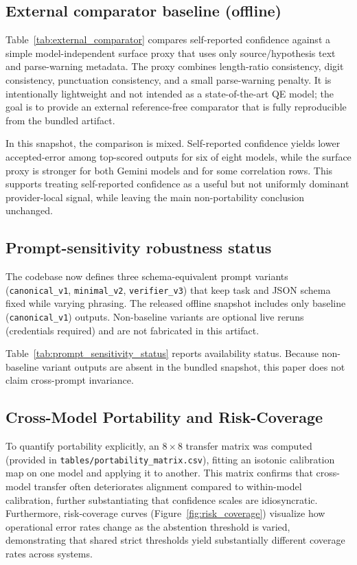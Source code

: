 \documentclass[10pt,conference]{IEEEtran}
\begin{document}


\subsection{External comparator baseline (offline)}
Table~\ref{tab:external_comparator} compares self-reported confidence against a simple model-independent surface proxy that uses only source/hypothesis text and parse-warning metadata. The proxy combines length-ratio consistency, digit consistency, punctuation consistency, and a small parse-warning penalty. It is intentionally lightweight and not intended as a state-of-the-art QE model; the goal is to provide an external reference-free comparator that is fully reproducible from the bundled artifact.

In this snapshot, the comparison is mixed. Self-reported confidence yields lower accepted-error among top-scored outputs for six of eight models, while the surface proxy is stronger for both Gemini models and for some correlation rows. This supports treating self-reported confidence as a useful but not uniformly dominant provider-local signal, while leaving the main non-portability conclusion unchanged.



\subsection{Prompt-sensitivity robustness status}
The codebase now defines three schema-equivalent prompt variants (\texttt{canonical\_v1}, \texttt{minimal\_v2}, \texttt{verifier\_v3}) that keep task and JSON schema fixed while varying phrasing. The released offline snapshot includes only baseline (\texttt{canonical\_v1}) outputs. Non-baseline variants are optional live reruns (credentials required) and are not fabricated in this artifact.

Table~\ref{tab:prompt_sensitivity_status} reports availability status. Because non-baseline variant outputs are absent in the bundled snapshot, this paper does not claim cross-prompt invariance.



\subsection{Cross-Model Portability and Risk-Coverage}
To quantify portability explicitly, an $8 \times 8$ transfer matrix was computed (provided in \texttt{tables/portability\_matrix.csv}), fitting an isotonic calibration map on one model and applying it to another. This matrix confirms that cross-model transfer often deteriorates alignment compared to within-model calibration, further substantiating that confidence scales are idiosyncratic. Furthermore, risk-coverage curves (Figure~\ref{fig:risk_coverage}) visualize how operational error rates change as the abstention threshold is varied, demonstrating that shared strict thresholds yield substantially different coverage rates across systems.
\end{document}
